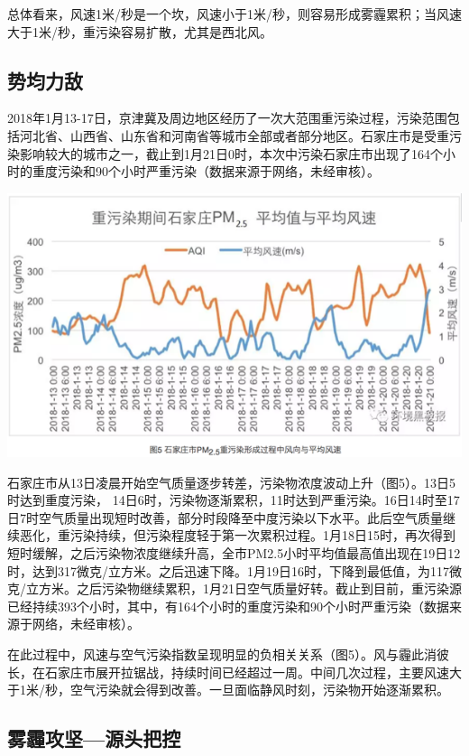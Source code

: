 \documentclass[]{book}
\begin{document}
总体看来，风速1米/秒是一个坎，风速小于1米/秒，则容易形成雾霾累积；当风速大于1米/秒，重污染容易扩散，尤其是西北风。

\hypertarget{ux52bfux5747ux529bux654c}{%
\subsection{势均力敌}\label{ux52bfux5747ux529bux654c}}

2018年1月13-17日，京津冀及周边地区经历了一次大范围重污染过程，污染范围包括河北省、山西省、山东省和河南省等城市全部或者部分地区。石家庄市是受重污染影响较大的城市之一，截止到1月21日0时，本次中污染石家庄市出现了164个小时的重度污染和90个小时严重污染（数据来源于网络，未经审核）。

\includegraphics[width=8.33in]{images/windhaze7}

石家庄市从13日凌晨开始空气质量逐步转差，污染物浓度波动上升（图5）。13日5时达到重度污染， 14日6时，污染物逐渐累积，11时达到严重污染。16日14时至17日7时空气质量出现短时改善，部分时段降至中度污染以下水平。此后空气质量继续恶化，重污染持续，但污染程度轻于第一次累积过程。1月18日15时，再次得到短时缓解，之后污染物浓度继续升高，全市PM2.5小时平均值最高值出现在19日12时，达到317微克/立方米。之后迅速下降。1月19日16时，下降到最低值，为117微克/立方米。之后污染物继续累积，1月21日空气质量好转。截止到目前，重污染源已经持续393个小时，其中，有164个小时的重度污染和90个小时严重污染（数据来源于网络，未经审核）。

在此过程中，风速与空气污染指数呈现明显的负相关关系（图5）。风与霾此消彼长，在石家庄市展开拉锯战，持续时间已经超过一周。中间几次过程，主要风速大于1米/秒，空气污染就会得到改善。一旦面临静风时刻，污染物开始逐渐累积。

\hypertarget{ux96feux973eux653bux575aux6e90ux5934ux628aux63a7}{%
\subsection{雾霾攻坚---源头把控}\label{ux96feux973eux653bux575aux6e90ux5934ux628aux63a7}}
\end{document}
